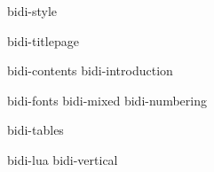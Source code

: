 

\environment bidi-style

\startdocument

    \component bidi-titlepage

    \startfrontmatter
        \component bidi-contents
        \component bidi-introduction
    \stopfrontmatter

    \startbodymatter
        \component bidi-fonts
        \component bidi-mixed
        \component bidi-numbering

        \component bidi-tables

        \component bidi-lua
        \component bidi-vertical
    \stopbodymatter

\stopdocument
